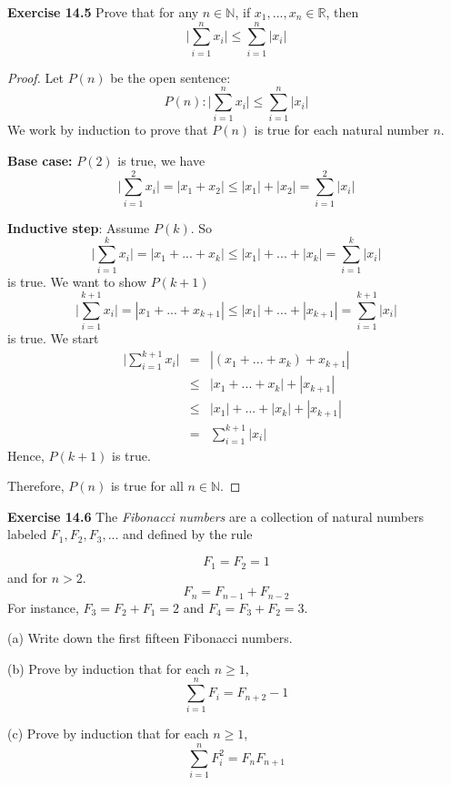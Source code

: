 \documentclass[12pt,oneside]{article}
\newenvironment{exercise}[1]{\vspace{.1in}\noindent\textbf{Exercise #1 \hspace{.05em}}}{}
\newcommand{\R}{\mathbb{R}}
\newcommand{\N}{\mathbb{N}}
\begin{document}

\begin{exercise}{14.5}
Prove that for any $n \in \N$, if $x_1,...,x_n \in \R$, then
\[\Bigg|\sum_{i=1}^{n} x_i\Bigg| \leq \sum_{i=1}^{n}|x_i|\]
\end{exercise}

\begin{proof}
Let $P(n)$ be the open sentence:
\[P(n): \Bigg|\sum_{i=1}^{n} x_i\Bigg| \leq \sum_{i=1}^{n}|x_i|\]
We work by induction to prove that $P(n)$ is true for each natural number $n$.

\textbf{Base case:} $P(2)$ is true, we have
\[\Bigg|\sum_{i=1}^{2} x_i\Bigg| = |x_1 + x_2| \leq |x_1| + |x_2| = \sum_{i=1}^{2}|x_i|\]

\textbf{Inductive step}: Assume $P(k)$. So
\[\Bigg|\sum_{i=1}^{k} x_i\Bigg| = |x_1 + ... + x_k| \leq |x_1| + ... + |x_k| = \sum_{i=1}^{k}|x_i|\]
is true. We want to show $P(k+1)$
\[\Bigg|\sum_{i=1}^{k+1} x_i\Bigg| = |x_1 + ... + x_{k+1}| \leq |x_1| + ... + |x_{k+1}| = \sum_{i=1}^{k+1}|x_i|\]
is true. We start
\begin{eqnarray*}
\Bigg|\sum_{i=1}^{k+1} x_i\Bigg| &=& |(x_1 + ... + x_k) + x_{k+1}| \\
&\leq& |x_1 + ... + x_k| + |x_{k+1}| \\
&\leq& |x_1| + ... + |x_k| + |x_{k+1}| \\
&=& \sum_{i=1}^{k+1}|x_i|
\end{eqnarray*}
Hence, $P(k+1)$ is true.

Therefore, $P(n)$ is true for all $n \in \N$.
\end{proof}



\begin{exercise}{14.6}
The \textit{Fibonacci numbers} are a collection of natural numbers labeled $F_1,F_2,F_3,...$ and defined by the rule

\[F_1 = F_2 = 1\]
and for $n > 2$.
\[F_n = F_{n-1} + F_{n-2}\]
For instance, $F_3 = F_2 + F_1 = 2$ and $F_4 = F_3 + F_2 = 3$.

(a) Write down the first fifteen Fibonacci numbers.

(b) Prove by induction that for each $n \geq 1$,
\[\sum_{i=1}^{n}F_i = F_{n+2} - 1\]

(c) Prove by induction that for each $n \geq 1$,
\[\sum_{i=1}^{n}F_i^2 = F_nF_{n+1}\]

\end{exercise}
\end{document}

